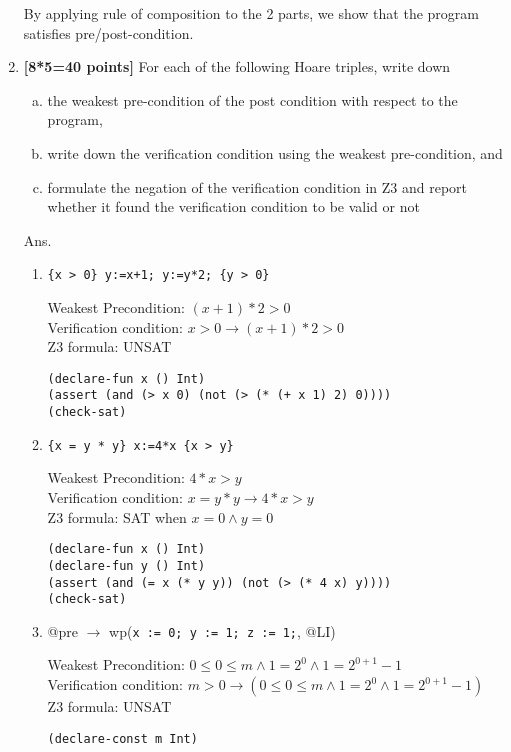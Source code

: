 \documentclass{article}
\begin{document}
\begin{enumerate}
By applying rule of composition to the 2 parts, we show that the program satisfies pre/post-condition.

\item \textbf{[8*5=40 points]}
For each of the following Hoare triples, write down
\begin{enumerate}[(a)]
\item the weakest pre-condition of the post condition with respect to the program,
\item write down the verification condition using the weakest pre-condition, and
\item formulate the negation of the verification condition in Z3 and report whether it found the verification condition to be valid or not
\end{enumerate}

\medskip
Ans.
\medskip

\begin{enumerate}[(1)]
    \item \verb|{x > 0} y:=x+1; y:=y*2; {y > 0}|

        Weakest Precondition: $(x+1)*2 > 0$ \\
        Verification condition: $x > 0 \to (x+1)*2 > 0$ \\
        Z3 formula: UNSAT
\begin{verbatim}
(declare-fun x () Int)
(assert (and (> x 0) (not (> (* (+ x 1) 2) 0))))
(check-sat)
\end{verbatim}
        
    \item \verb|{x = y * y} x:=4*x {x > y}|

        Weakest Precondition: $4*x > y$ \\
        Verification condition: $x = y*y \to 4*x > y$ \\
        Z3 formula: SAT when $x=0 \land y=0$
\begin{verbatim}
(declare-fun x () Int)
(declare-fun y () Int)
(assert (and (= x (* y y)) (not (> (* 4 x) y))))
(check-sat)
\end{verbatim}

\item @pre $\to$ wp(\verb|x := 0; y := 1; z := 1;|, @LI)

        Weakest Precondition: $0 \leq 0 \leq m \land 1 = 2^0 \land 1 = 2^{0 + 1} - 1$ \\
        Verification condition: $m > 0 \to (0 \leq 0 \leq m \land 1 = 2^0 \land 1 = 2^{0 + 1} - 1)$ \\
        Z3 formula: UNSAT
\begin{verbatim}
(declare-const m Int)


\end{verbatim}
\end{enumerate}
\end{enumerate}
\end{document}
